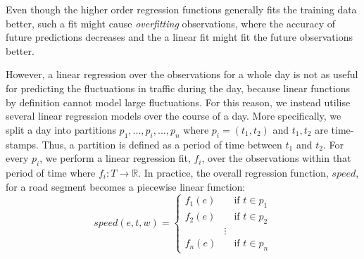 Even though the higher order regression functions generally fits the training data better, such a fit might cause \emph{overfitting} observations, where the accuracy of future predictions decreases and the a linear fit might fit the future observations better. \par
However, a linear regression over the observations for a whole day is not as useful for predicting the fluctuations in traffic during the day, because linear functions by definition cannot model large fluctuations. For this reason, we instead utilise several linear regression models over the course of a day. More specifically, we split a day into partitions $p_1,...,p_i,...,p_n$ where $p_i = (t_1,t_2)$ and $t_1,t_2$ are time-stamps. Thus, a partition is defined as a period of time between $t_1$ and $t_2$. For every $p_i$, we perform a linear regression fit, $f_i$, over the observations within that period of time where $f_i:T \rightarrow \mathbb{R}$. In practice, the overall regression function, $speed$, for a road segment becomes a piecewise linear function:
\begin{equation}\label{eq:speed-piecewise}
speed(e,t, w) =
\begin{cases}
f_1(e)       & \quad \text{if } t \in p_1\\
f_2(e)  & \quad \text{if } t \in p_2\\
&\vdots\\
f_n(e) & \quad \text{if } t \in p_n
\end{cases}
\end{equation}

